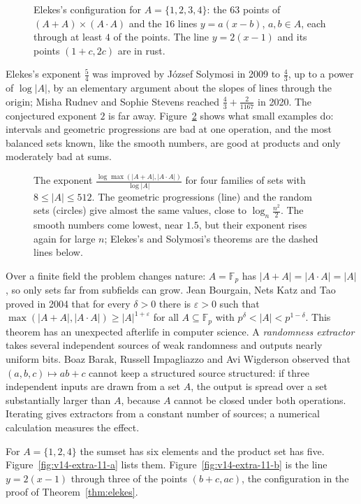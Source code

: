 \begin{figure}[ht]
\centering
{}
\caption{Elekes's configuration for $A=\{1,2,3,4\}$: the $63$ points of $(A+A)\times(A\cdot A)$ and the $16$ lines $y=a(x-b)$, $a,b\in A$, each through at least $4$ of the points. The line $y=2(x-1)$ and its points $(1+c,2c)$ are in rust.}
\label{fig:elekes}
\end{figure}

Elekes's exponent $\frac54$ was improved by József Solymosi in 2009 to $\frac43$, up to a power of $\log|A|$, by an elementary argument about the slopes of lines through the origin; Misha Rudnev and Sophie Stevens reached $\frac43+\frac2{1167}$ in 2020. The conjectured exponent $2$ is far away. Figure~\ref{fig:sumprod} shows what small examples do: intervals and geometric progressions are bad at one operation, and the most balanced sets known, like the smooth numbers, are good at products and only moderately bad at sums.

\begin{figure}[ht]
\centering
{}
\caption{The exponent $\frac{\log\max(|A+A|,|A\cdot A|)}{\log|A|}$ for four families of sets with $8\le|A|\le512$. The geometric progressions (line) and the random sets (circles) give almost the same values, close to $\log_n\frac{n^2}2$. The smooth numbers come lowest, near $1.5$, but their exponent rises again for large $n$; Elekes's and Solymosi's theorems are the dashed lines below.}
\label{fig:sumprod}
\end{figure}

Over a finite field the problem changes nature: $A=\mathbb F_p$ has $|A+A|=|A\cdot A|=|A|$, so only sets far from subfields can grow. Jean Bourgain, Nets Katz and Tao proved in 2004 that for every $\delta>0$ there is $\varepsilon>0$ such that $\max(|A+A|,|A\cdot A|)\ge|A|^{1+\varepsilon}$ for all $A\subseteq\mathbb F_p$ with $p^\delta<|A|<p^{1-\delta}$. This theorem has an unexpected afterlife in computer science. A \emph{randomness extractor} takes several independent sources of weak randomness and outputs nearly uniform bits. Boaz Barak, Russell Impagliazzo and Avi Wigderson observed that $(a,b,c)\mapsto ab+c$ cannot keep a structured source structured: if three independent inputs are drawn from a set $A$, the output is spread over a set substantially larger than $A$, because $A$ cannot be closed under both operations. Iterating gives extractors from a constant number of sources; a numerical calculation measures the effect.

For $A=\{1,2,4\}$ the sumset has six elements and the product set has five. Figure~\ref{fig:v14-extra-11-a} lists them. Figure~\ref{fig:v14-extra-11-b} is the line $y=2(x-1)$ through three of the points $(b+c,ac)$, the configuration in the proof of Theorem~\ref{thm:elekes}.

